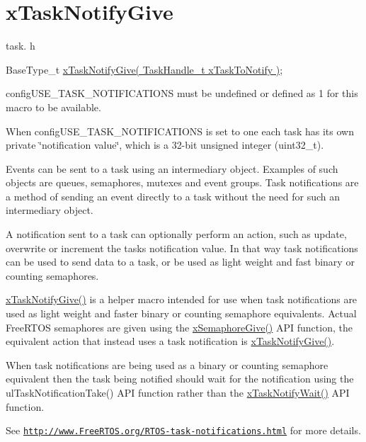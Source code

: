 \hypertarget{group__xTaskNotifyGive}{}\section{x\+Task\+Notify\+Give}
\label{group__xTaskNotifyGive}
task. h 
\begin{DoxyPre}BaseType\_t \hyperlink{task_8h_ac60cbd05577a3e4f3c3587dd9b213930}{xTaskNotifyGive( TaskHandle\_t xTaskToNotify )};\end{DoxyPre}


config\+U\+S\+E\+\_\+\+T\+A\+S\+K\+\_\+\+N\+O\+T\+I\+F\+I\+C\+A\+T\+I\+O\+NS must be undefined or defined as 1 for this macro to be available.

When config\+U\+S\+E\+\_\+\+T\+A\+S\+K\+\_\+\+N\+O\+T\+I\+F\+I\+C\+A\+T\+I\+O\+NS is set to one each task has its own private \char`\"{}notification value\char`\"{}, which is a 32-\/bit unsigned integer (uint32\+\_\+t).

Events can be sent to a task using an intermediary object. Examples of such objects are queues, semaphores, mutexes and event groups. Task notifications are a method of sending an event directly to a task without the need for such an intermediary object.

A notification sent to a task can optionally perform an action, such as update, overwrite or increment the task\textquotesingle{}s notification value. In that way task notifications can be used to send data to a task, or be used as light weight and fast binary or counting semaphores.

\hyperlink{task_8h_ac60cbd05577a3e4f3c3587dd9b213930}{x\+Task\+Notify\+Give()} is a helper macro intended for use when task notifications are used as light weight and faster binary or counting semaphore equivalents. Actual Free\+R\+T\+OS semaphores are given using the \hyperlink{semphr_8h_aae55761cabfa9bf85c8f4430f78c0953}{x\+Semaphore\+Give()} A\+PI function, the equivalent action that instead uses a task notification is \hyperlink{task_8h_ac60cbd05577a3e4f3c3587dd9b213930}{x\+Task\+Notify\+Give()}.

When task notifications are being used as a binary or counting semaphore equivalent then the task being notified should wait for the notification using the ul\+Task\+Notification\+Take() A\+PI function rather than the \hyperlink{task_8h_a0475fcda9718f403521c270a7270ff93}{x\+Task\+Notify\+Wait()} A\+PI function.

See \href{http://www.FreeRTOS.org/RTOS-task-notifications.html}{\tt http\+://www.\+Free\+R\+T\+O\+S.\+org/\+R\+T\+O\+S-\/task-\/notifications.\+html} for more details.


